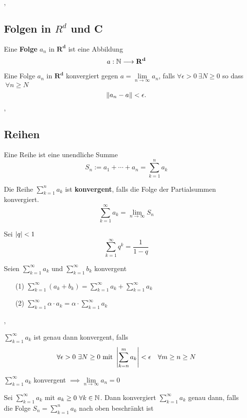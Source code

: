 \sep

\subsection{Folgen in $R^{d}$ und C}

\Def[2.6.1] Eine \textbf{Folge} $a_n$ in $\mathbf{R^{d}}$ ist eine Abbildung
\[
a: \mathbb{N}\longrightarrow \mathbf{R^{d}}
\] 

\Def[2.6.2] Eine Folge $a_n$ in $\mathbf{R^{d}}$ konvergiert gegen ${a = \lim\limits_{n \rightarrow \infty} a_{n}}$, falls $ \forall \epsilon > 0 \ \exists N \geq 0$ so dass $\ \forall n\geq N$
\[
 \left\lVert a_n-a \right\rVert < \epsilon.
\]
\sep

\subsection{Reihen}

\Def[2.7.0] Eine Reihe ist eine unendliche Summe
\[S_{n} := a_{1}  + \cdots + a_{n} = \sum_{k=1}^{n} a_{k}\]

\Def[2.7.1] Die Reihe $\sum_{k=1}^{n} a_{k}$ ist \textbf{konvergent}, falls die Folge der Partialsummen konvergiert. 
\[\sum_{k=1}^{\infty} a_{k} = \lim\limits_{n \rightarrow \infty} S_{n} \]

 Sei $\left\lvert q \right\rvert < 1$
\[\sum_{k=1}^{\infty} q^k = \frac{1}{1-q} \]

\Satz[2.7.4] Seien $\sum_{k=1}^{\infty} a_{k}$ und $\sum_{k=1}^{\infty} b_{k}$ konvergent
\begin{enumerate}
\item[(1)] $\sum_{k=1}^{\infty} (a_{k} + b_{k}) = \sum_{k=1}^{\infty} a_{k} + \sum_{k=1}^{\infty} a_{k}$ 
\item[(2)] $\sum_{k=1}^{\infty} \alpha \cdot a_{k} = \alpha \cdot \sum_{k=1}^{\infty} a_{k}$
\end{enumerate}

\sep

 $\sum_{k=1}^{\infty} a_{k}$ ist genau dann konvergent, falls
\[ \forall \epsilon > 0 \ \exists N \geq 0 \text{ mit } \left\lvert \sum_{k=n}^{m} a_{k} \right\rvert < \epsilon \quad \forall m \geq n \geq N\]

\Bem $\sum_{k=1}^{\infty} a_{k}$ konvergent $\implies  \lim\limits_{n \rightarrow \infty} a_{n} = 0$

\Satz[2.7.6] Sei $\sum_{k=1}^{\infty} a_{k}$ mit $a_{k} \geq  0 \ \forall k \in \mathbb{N}$. Dann konvergiert
$\sum_{k=1}^{\infty} a_{k}$ genau dann, falls die Folge $S_{n} = \sum_{k=1}^{n} a_{k}$ nach oben beschränkt ist

